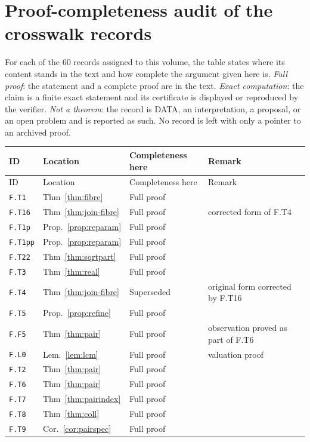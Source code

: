 \documentclass[11pt,oneside,openany]{book}
\theoremstyle{definition}
\theoremstyle{remark}
\begin{document}
\chapter{Proof-completeness audit of the crosswalk records}\label{app:audit}
For each of the 60 records assigned to this volume, the table states where its content stands in the text and how complete the argument given here is. \emph{Full proof}: the statement and a complete proof are in the text. \emph{Exact computation}: the claim is a finite exact statement and its certificate is displayed or reproduced by the verifier. \emph{Not a theorem}: the record is DATA, an interpretation, a proposal, or an open problem and is reported as such. No record is left with only a pointer to an archived proof.
\footnotesize
\begin{longtable}{@{}p{15mm}p{33mm}p{36mm}p{36mm}@{}}
\toprule ID & Location & Completeness here & Remark\\\midrule\endfirsthead
\toprule ID & Location & Completeness here & Remark\\\midrule\endhead
\texttt{F.T1} & Thm~\ref{thm:fibre} & Full proof &  \\
\texttt{F.T16} & Thm~\ref{thm:join-fibre} & Full proof & corrected form of F.T4 \\
\texttt{F.T1p} & Prop.~\ref{prop:reparam} & Full proof &  \\
\texttt{F.T1pp} & Prop.~\ref{prop:reparam} & Full proof &  \\
\texttt{F.T22} & Thm~\ref{thm:sqrtpart} & Full proof &  \\
\texttt{F.T3} & Thm~\ref{thm:real} & Full proof &  \\
\texttt{F.T4} & Thm~\ref{thm:join-fibre} & Superseded & original form corrected by F.T16 \\
\texttt{F.T5} & Prop.~\ref{prop:refine} & Full proof & \\
\texttt{F.F5} & Thm~\ref{thm:pair} & Full proof & observation proved as part of F.T6 \\
\texttt{F.L0} & Lem.~\ref{lem:lcm} & Full proof & valuation proof \\
\texttt{F.T2} & Thm~\ref{thm:pair} & Full proof &  \\
\texttt{F.T6} & Thm~\ref{thm:pair} & Full proof &  \\
\texttt{F.T7} & Thm~\ref{thm:pairindex} & Full proof &  \\
\texttt{F.T8} & Thm~\ref{thm:coll} & Full proof &  \\
\texttt{F.T9} & Cor.~\ref{cor:pairspec} & Full proof &  \\

\end{longtable}
\end{document}
